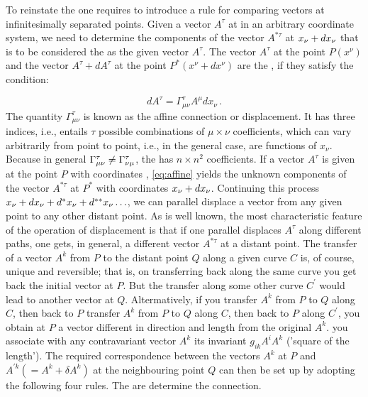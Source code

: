 \documentclass[draft]{article}
\begin{document}
{To reinstate the  one requires to introduce a rule for comparing vectors at infinitesimally separated points. Given a vector $A^\tau$ at \xn in an arbitrary coordinate system, we need to determine the components of the vector $A^{\ast\tau}$ at $x_{\nu}+dx_{\nu}$ that is to be considered the  as the given vector $A^\tau$. The vector $A^{\tau}$ at the point $P\left(x^{\nu}\right)$ and the vector $A^{\tau}+d A^{\tau}$ at the point $P^{\ast}\left(x^{\nu}+d x^{\nu}\right)$ are the , if they satisfy the condition:

\begin{equation}\label{eq:affine}
dA^\tau = \Gamma^\tau_{\mu\nu}A^{\mu} dx_\nu\,.
\end{equation}
%
The quantity $\Gamma^\tau_{\mu\nu}$ is known as the affine connection or displacement. It has three indices, i.e., entails $\tau$ possible combinations of $\mu \times \nu$ coefficients, which can vary arbitrarily from point to point, i.e., in the general case, are functions of $x_\nu$. Because in general $\Gamma^\tau_{\mu\nu} \neq \Gamma^\tau_{\nu\mu}$, the \Gtmn has $n \times n^2$ coefficients. If a vector $A^\tau$ is given at the point $P$ with coordinates \xn, \cref{eq:affine} yields the unknown components of the vector $A^{\ast\tau}$ at $P^*$ with coordinates $x_{\nu}+dx_\nu$. Continuing this process $
x_{\nu}+dx_{\nu}+d^{\ast} x_{\nu}+d^{\ast \ast} x_{\nu} \ldots$, we can parallel displace a vector from any given point to any other distant point. As is well known, the most characteristic feature of the operation of displacement is that if one parallel displaces $A^\tau$ along different paths, one gets, in general, a different vector $A^{\ast \tau}$ at a distant point. The transfer of a vector $A^{k}$ from $P$ to the distant point $Q$ along a given curve $C$ is, of course, unique and reversible; that is, on transferring back along the same curve you get back the initial vector at $P$. But the transfer along some other curve $C^{\prime}$ would lead to another vector at $Q$. Altermatively, if you transfer $A^{k}$ from $P$ to $Q$ along $C$, then back to $P$ transfer $A^{k}$ from $P$ to $Q$ along $C$, then back to $P$ along $C^{\prime}$, you obtain at $P$ a vector different in direction and length from the original $A^{k}$. you associate with any contravariant vector $A^{k}$ its invariant $g_{i k} A^{i} A^{k}$ ('square of the length'). The required correspondence between the vectors $A^{k}$ at $P$ and $A^{\prime k}\left(=A^{k}+\delta A^{k}\right)$ at the neighbouring point $Q$ can then be set up by adopting the following four rules. The \gmn are determine the connection.

}
\end{document}
